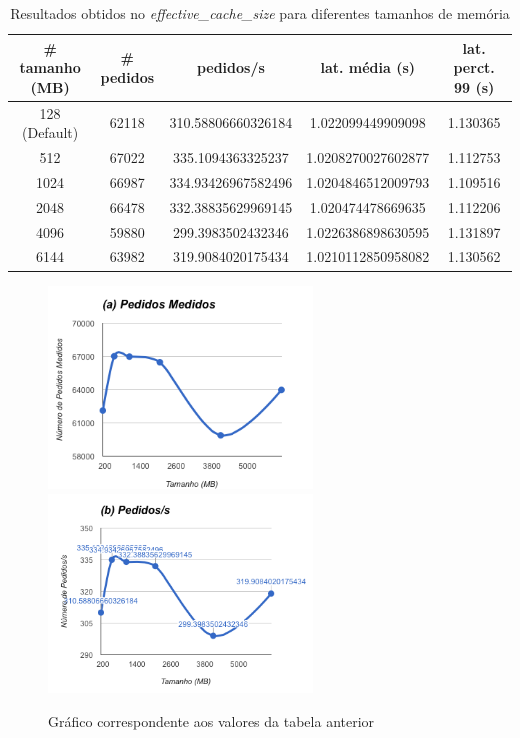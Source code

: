 \begin{table}[!h]
\center
\small
\begin{tabular}{|c|c|c|c|c|}
\hline
\textbf{\# tamanho (MB)} & \textbf{\# pedidos} & \textbf{pedidos/s} & \textbf{lat. média (s)} & \textbf{lat. perct. 99 (s)}  \\ \hline
128 (Default) & 62118 & 310.58806660326184 & 1.022099449909098 & 1.130365  \\ \hline
512 & 67022 & 335.1094363325237 & 1.0208270027602877 & 1.112753  \\ \hline
1024 & 66987 & 334.93426967582496 & 1.0204846512009793 & 1.109516  \\ \hline
2048 & 66478 & 332.38835629969145 & 1.020474478669635 & 1.112206  \\ \hline
4096 & 59880 & 299.3983502432346 & 1.0226386898630595 & 1.131897  \\ \hline
6144 & 63982 & 319.9084020175434 & 1.0210112850958082 & 1.130562  \\ \hline
\end{tabular}
\caption{Resultados obtidos no \textit{effective\_cache\_size} para diferentes tamanhos de memória}
\end{table}

\begin{figure}[ht!]
\centering
\includegraphics[width=70mm]{img/02_ecs_b.png}
\includegraphics[width=70mm]{img/02_ecs_a.png}
\caption{Gráfico correspondente aos valores da tabela anterior\label{overflow}}
\end{figure}


